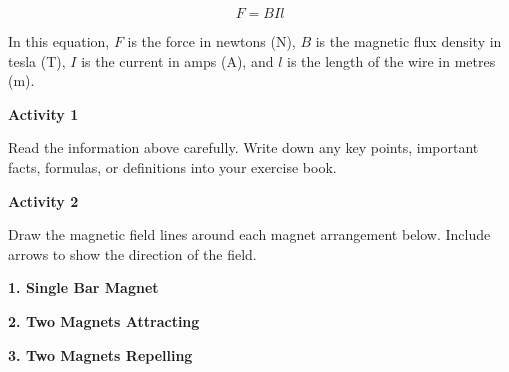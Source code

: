 \documentclass[12pt]{article}
\begin{document}
\[
F = B I l
\]

In this equation, \(F\) is the force in newtons (N), \(B\) is the magnetic flux density in tesla (T), \(I\) is the current in amps (A), and \(l\) is the length of the wire in metres (m).

\vspace{4em}

\textbf{Activity 1}

Read the information above carefully. Write down any key points, important facts, formulas, or definitions into your exercise book.

\newpage

\textbf{Activity 2}

Draw the magnetic field lines around each magnet arrangement below. Include arrows to show the direction of the field.

\vspace{2em}

\textbf{1. Single Bar Magnet}

\vspace{6em}

\begin{center}
\end{center}

\vspace{6em}

\textbf{2. Two Magnets Attracting}

\vspace{6em}

\begin{center}
\end{center}

\vspace{6em}

\textbf{3. Two Magnets Repelling}

\vspace{6em}
\end{document}
